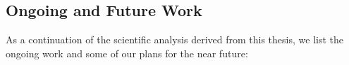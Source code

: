 \documentclass[12pt]{article}
\begin{document}

\subsection{Ongoing and Future Work}
As a continuation of the scientific analysis derived from this thesis, we list the ongoing work and some of our plans for the near future:
\end{document}

